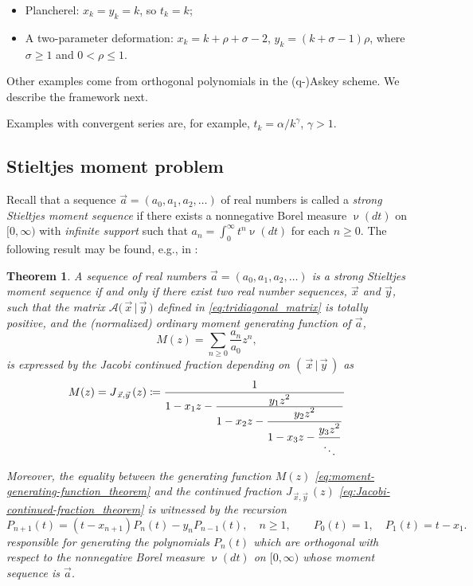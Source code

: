 \documentclass[letterpaper,11pt,oneside,reqno]{article}
\numberwithin{equation}{section}
\newtheorem{theorem}[proposition]{Theorem}
\theoremstyle{definition}
\begin{document}
\begin{itemize}
	\item Plancherel: $x_k=y_k=k$, so $t_k=k$;
	\item A two-parameter deformation:
		$x_k=k+\rho+\sigma-2$, $y_k=(k+\sigma-1)\rho$,
		where $\sigma\ge 1$ and $0<\rho\le 1$.
\end{itemize}
Other examples come from orthogonal polynomials
in the (q-)Askey scheme. We describe the framework next.

Examples with convergent series are, for example, $t_k=\alpha/k^\gamma$, $\gamma>1$.

\subsection{Stieltjes moment problem}


Recall that a sequence
$\vec{a}=(a_0, a_1, a_2, \dots)$ of real numbers is called a
\emph{strong Stieltjes moment
sequence} if there exists a nonnegative Borel measure $\upnu(dt)$ on $[0,\infty)$
with \emph{infinite support} such that
$a_n = \int_0^\infty t^n  \upnu(dt)$ for each $n \geq 0$.
The following result may be found, e.g.,
in
\cite{sokal2020euler}:

\begin{theorem}
\label{thm:stieltjes-moments-theorem}
A sequence of real numbers $\vec{a} = (a_0, a_1, a_2, \dots)$ is a strong Stieltjes moment sequence if and only if there exist two real number sequences, $\vec{x}$ and $\vec{y}$, such that the matrix $\mathcal{A} \big( \, \vec{x} \, | \, \vec{y} \, \big)$ defined in \eqref{eq:tridiagonal_matrix} is totally positive, and the (normalized) ordinary moment generating function of $\vec a$,
\begin{equation}
	\label{eq:moment-generating-function_theorem}
	M(z) = \sum_{n \geq 0} \frac{a_n}{a_0} z^n,
\end{equation}
is expressed by the Jacobi continued fraction
depending on $( \, \vec{x} \, | \, \vec{y} \, )$ as
\begin{equation}
	\label{eq:Jacobi-continued-fraction_theorem}
	M(z)=
	J_{\, \vec{x}, \vec{y}} \,(z) \coloneqq
{1 \over {1 - x_1z - {\displaystyle y_1z^2 \over {\displaystyle 1 - x_2 z - {\displaystyle y_2z^2 \over
{\displaystyle 1 - x_3 z - {\displaystyle y_3z^2 \over {\ddots } } } } } } } }
\end{equation}

Moreover,
the equality between the
generating function $M(z)$ \eqref{eq:moment-generating-function_theorem}
and the continued fraction
$J_{\, \vec{x}, \vec{y}} \,(z)$ \eqref{eq:Jacobi-continued-fraction_theorem}
is witnessed by the recursion
\begin{equation*}
	P_{n+1}(t) = (t - x_{n+1})P_n(t) - y_n P_{n-1}(t),
	\quad n \geq 1,
	\qquad
	P_0(t) = 1, \quad P_1(t) = t - x_1.
\end{equation*}
responsible for generating the polynomials
$P_n(t)$ which are orthogonal with respect to the nonnegative
Borel measure $\upnu(dt)$
on $[0,\infty)$ whose moment sequence is
$\vec{a}$.
\end{theorem}
\end{document}
